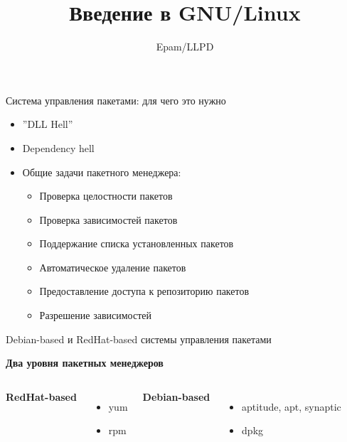 \documentclass[ignorenonframetext, professionalfonts, hyperref={pdftex, unicode}]{beamer}
\title{Введение в GNU/Linux}
\author{Epam/LLPD}
\begin{document}
\frame{
	\tableofcontents
}

\begin{frame}{Система управления пакетами: для чего это нужно}
\begin{itemize}
 \item ''DLL Hell''
 \item Dependency hell
 \item Общие задачи пакетного менеджера:
   \begin{itemize}
     \item Проверка целостности пакетов
     \item Проверка зависимостей пакетов
        \item Поддержание списка установленных пакетов
        \item Автоматическое удаление пакетов
     \item Предоставление доступа к репозиторию пакетов
     \item Разрешение зависимостей
   \end{itemize}
\end{itemize}
\end{frame}

\begin{frame}{Debian-based и RedHat-based системы управления пакетами}
\begin{center}
 \textbf{Два уровня пакетных менеджеров}
\end{center}
\begin{columns}
  \begin{center}
    \textbf{RedHat-based}
  \end{center}
  \begin{itemize}
    \item yum
    \item rpm
  \end{itemize}
  \begin{center}
    \textbf{Debian-based}
  \end{center}
  \begin{itemize}
    \item aptitude, apt, synaptic
    \item dpkg
  \end{itemize}
\end{columns}
\end{frame}
\end{document}
